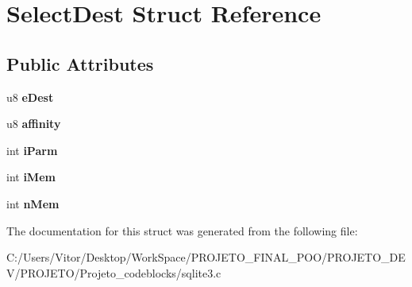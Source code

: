 \hypertarget{struct_select_dest}{\section{Select\-Dest Struct Reference}
\label{struct_select_dest}
}
\subsection*{Public Attributes}
\begin{DoxyCompactItemize}
\item 
\hypertarget{struct_select_dest_a779c1809acadd15898db0b20e31cc23f}{u8 {\bfseries e\-Dest}}\label{struct_select_dest_a779c1809acadd15898db0b20e31cc23f}

\item 
\hypertarget{struct_select_dest_a7a5b76f4fd40a1b84356fc58e0d6b173}{u8 {\bfseries affinity}}\label{struct_select_dest_a7a5b76f4fd40a1b84356fc58e0d6b173}

\item 
\hypertarget{struct_select_dest_a6ca726a6f8054df61baa150c5010c53f}{int {\bfseries i\-Parm}}\label{struct_select_dest_a6ca726a6f8054df61baa150c5010c53f}

\item 
\hypertarget{struct_select_dest_ab060aa655304afa76b1a2f923a2b0ae5}{int {\bfseries i\-Mem}}\label{struct_select_dest_ab060aa655304afa76b1a2f923a2b0ae5}

\item 
\hypertarget{struct_select_dest_a1868d637be46616a4206fd8ff9f4ac52}{int {\bfseries n\-Mem}}\label{struct_select_dest_a1868d637be46616a4206fd8ff9f4ac52}

\end{DoxyCompactItemize}


The documentation for this struct was generated from the following file\-:\begin{DoxyCompactItemize}
\item 
C\-:/\-Users/\-Vitor/\-Desktop/\-Work\-Space/\-P\-R\-O\-J\-E\-T\-O\-\_\-\-F\-I\-N\-A\-L\-\_\-\-P\-O\-O/\-P\-R\-O\-J\-E\-T\-O\-\_\-\-D\-E\-V/\-P\-R\-O\-J\-E\-T\-O/\-Projeto\-\_\-codeblocks/sqlite3.\-c\end{DoxyCompactItemize}
